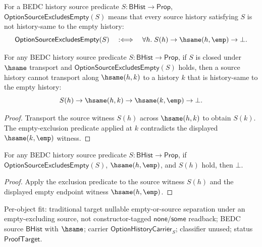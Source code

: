 \begin{definition}
\label{def:option-source-excludes-empty}
For a BEDC history source predicate $S:\mathsf{BHist}\to\mathsf{Prop}$,
$\mathsf{OptionSourceExcludesEmpty}(S)$ means that every source history
satisfying $S$ is not history-same to the empty history:
$$
\mathsf{OptionSourceExcludesEmpty}(S)
\quad:\Longleftrightarrow\quad
\forall h.\; S(h)\to\hsame(h,\emp)\to\bot.
$$
\end{definition}

\begin{theorem}
\label{thm:option-source-excludes-empty-hsame-transport-absurd}
For any BEDC history source predicate $S:\mathsf{BHist}\to\mathsf{Prop}$, if
$S$ is closed under $\hsame$ transport and
$\mathsf{OptionSourceExcludesEmpty}(S)$ holds, then a source history cannot
transport along $\hsame(h,k)$ to a history $k$ that is history-same to the empty
history:
$$
S(h)\to\hsame(h,k)\to\hsame(k,\emp)\to\bot.
$$
\end{theorem}
\begin{proof}
Transport the source witness $S(h)$ across $\hsame(h,k)$ to obtain $S(k)$.
The empty-exclusion predicate applied at $k$ contradicts the displayed
$\hsame(k,\emp)$ witness.
\end{proof}

\begin{theorem}
\label{thm:option-history-carrier-absent-source-separation}
For any BEDC history source predicate $S:\mathsf{BHist}\to\mathsf{Prop}$, if
$\mathsf{OptionSourceExcludesEmpty}(S)$, $\hsame(h,\emp)$, and $S(h)$ hold, then
$\bot$.
\end{theorem}
\begin{proof}
Apply the exclusion predicate to the source witness $S(h)$ and the displayed
empty endpoint witness $\hsame(h,\emp)$.
\end{proof}

Per-object fit: traditional target nullable empty-or-source separation under an
empty-excluding source, not constructor-tagged $\mathsf{none}/\mathsf{some}$
readback; BEDC source $\mathsf{BHist}$ with $\hsame$; carrier
$\mathsf{OptionHistoryCarrier}_S$; classifier unused; status $\mathsf{ProofTarget}$.

